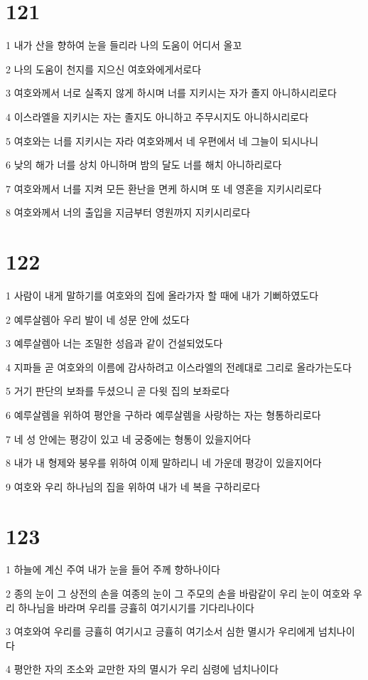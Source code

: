 \chapter{121}

\par 1 내가 산을 향하여 눈을 들리라 나의 도움이 어디서 올꼬
\par 2 나의 도움이 천지를 지으신 여호와에게서로다
\par 3 여호와께서 너로 실족지 않게 하시며 너를 지키시는 자가 졸지 아니하시리로다
\par 4 이스라엘을 지키시는 자는 졸지도 아니하고 주무시지도 아니하시리로다
\par 5 여호와는 너를 지키시는 자라 여호와께서 네 우편에서 네 그늘이 되시나니
\par 6 낮의 해가 너를 상치 아니하며 밤의 달도 너를 해치 아니하리로다
\par 7 여호와께서 너를 지켜 모든 환난을 면케 하시며 또 네 영혼을 지키시리로다
\par 8 여호와께서 너의 출입을 지금부터 영원까지 지키시리로다

\chapter{122}

\par 1 사람이 내게 말하기를 여호와의 집에 올라가자 할 때에 내가 기뻐하였도다
\par 2 예루살렘아 우리 발이 네 성문 안에 섰도다
\par 3 예루살렘아 너는 조밀한 성읍과 같이 건설되었도다
\par 4 지파들 곧 여호와의 이름에 감사하려고 이스라엘의 전례대로 그리로 올라가는도다
\par 5 거기 판단의 보좌를 두셨으니 곧 다윗 집의 보좌로다
\par 6 예루살렘을 위하여 평안을 구하라 예루살렘을 사랑하는 자는 형통하리로다
\par 7 네 성 안에는 평강이 있고 네 궁중에는 형통이 있을지어다
\par 8 내가 내 형제와 붕우를 위하여 이제 말하리니 네 가운데 평강이 있을지어다
\par 9 여호와 우리 하나님의 집을 위하여 내가 네 복을 구하리로다

\chapter{123}

\par 1 하늘에 계신 주여 내가 눈을 들어 주께 향하나이다
\par 2 종의 눈이 그 상전의 손을 여종의 눈이 그 주모의 손을 바람같이 우리 눈이 여호와 우리 하나님을 바라며 우리를 긍휼히 여기시기를 기다리나이다
\par 3 여호와여 우리를 긍휼히 여기시고 긍휼히 여기소서 심한 멸시가 우리에게 넘치나이다
\par 4 평안한 자의 조소와 교만한 자의 멸시가 우리 심령에 넘치나이다

